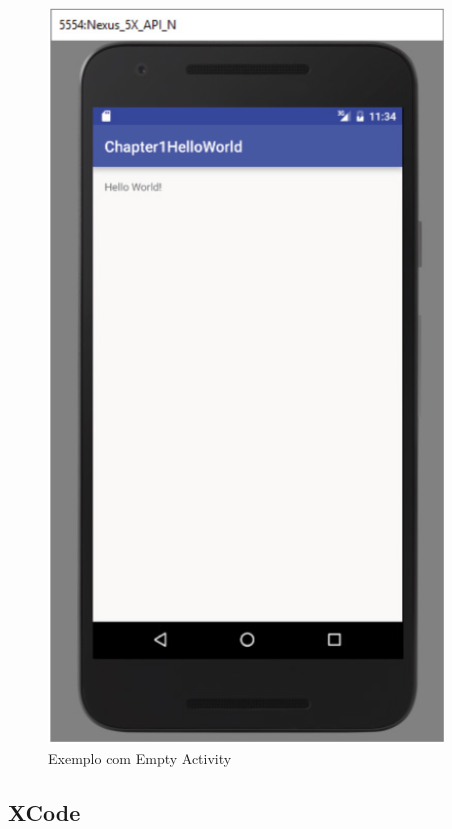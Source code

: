 \begin{figure}[H]
    \centering
    \includegraphics[scale=0.8]{images/android_studio_primeiro_programa}
    \caption[Exemplo com Empty Activity]
    {Exemplo com Empty Activity \cite{DiMarzio2016}}
    \label{fig:android_studio_primeiro_programa}
\end{figure}

\subsection{XCode}
